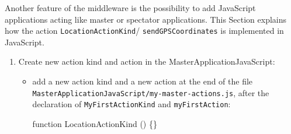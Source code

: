 Another feature of the middleware is the possibility to add JavaScript
applications acting like master or spectator applications. This
Section explains how the action \texttt{LocationActionKind}/
\texttt{sendGPSCoordinates} is implemented in JavaScript.

\begin{enumerate}
\item Create new \textsf{action kind} and \textsf{action} in the
  MasterApplicationJavaScript:
\begin{itemize}
\item add a new \textsf{action kind} and a new \textsf{action} at the
  end of the file
  \texttt{MasterApplicationJavaScript/my-master-actions.js}, after the
  declaration of \texttt{MyFirstActionKind} and
  \texttt{myFirstAction}:
\begin{shellcmd}
function LocationActionKind () \{\}


\end{shellcmd}
\end{itemize}
\end{enumerate}
